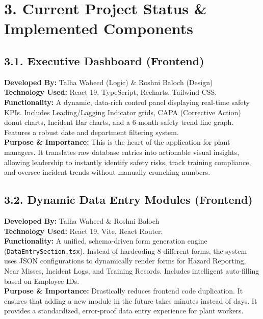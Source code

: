 \documentclass[12pt,a4paper]{article}
\begin{document}
\section*{3. Current Project Status \& Implemented Components}

\subsection*{3.1. Executive Dashboard (Frontend)}
\textbf{Developed By:} Talha Waheed (Logic) \& Roshni Baloch (Design) \\
\textbf{Technology Used:} React 19, TypeScript, Recharts, Tailwind CSS. \\
\textbf{Functionality:} A dynamic, data-rich control panel displaying real-time safety KPIs. Includes Leading/Lagging Indicator grids, CAPA (Corrective Action) donut charts, Incident Bar charts, and a 6-month safety trend line graph. Features a robust date and department filtering system. \\
\textbf{Purpose \& Importance:} This is the heart of the application for plant managers. It translates raw database entries into actionable visual insights, allowing leadership to instantly identify safety risks, track training compliance, and oversee incident trends without manually crunching numbers.

\subsection*{3.2. Dynamic Data Entry Modules (Frontend)}
\textbf{Developed By:} Talha Waheed \& Roshni Baloch \\
\textbf{Technology Used:} React 19, Vite, React Router. \\
\textbf{Functionality:} A unified, schema-driven form generation engine (\texttt{DataEntrySection.tsx}). Instead of hardcoding 8 different forms, the system uses JSON configurations to dynamically render forms for Hazard Reporting, Near Misses, Incident Logs, and Training Records. Includes intelligent auto-filling based on Employee IDs. \\
\textbf{Purpose \& Importance:} Drastically reduces frontend code duplication. It ensures that adding a new module in the future takes minutes instead of days. It provides a standardized, error-proof data entry experience for plant workers.
\end{document}
